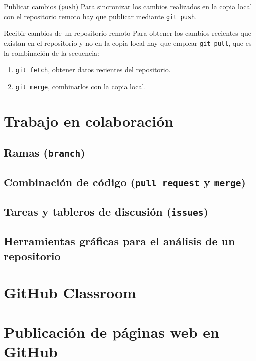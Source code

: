 \documentclass[xcolor={usenames,svgnames,dvipsnames}]{beamer}
\begin{document}
\begin{frame}[label={sec:org44cbae1},fragile]{Publicar cambios (\texttt{push})}
 Para sincronizar los cambios realizados en la copia local con el repositorio remoto hay que publicar mediante \texttt{git push}.
\end{frame}
\begin{frame}[label={sec:org7f3fc6f},fragile]{Recibir cambios de un repositorio remoto}
 Para obtener los cambios recientes que existan en el repositorio y no en la copia local hay que emplear \texttt{git pull}, que es la combinación de la secuencia:
\begin{enumerate}
\item \texttt{git fetch}, obtener datos recientes del repositorio.
\item \texttt{git merge}, combinarlos con la copia local.
\end{enumerate}
\end{frame}

\section{Trabajo en colaboración}
\label{sec:org71f1610}
\subsection{Ramas (\texttt{branch})}
\label{sec:org9aa3c8b}
\subsection{Combinación de código (\texttt{pull request} y \texttt{merge})}
\label{sec:orgef97ace}
\subsection{Tareas y tableros de discusión (\texttt{issues})}
\label{sec:orgc62fa49}
\subsection{Herramientas gráficas para el análisis de un repositorio}
\label{sec:org8c7a92f}
\section{GitHub Classroom}
\label{sec:orgad19371}
\section{Publicación de páginas web en GitHub}
\label{sec:orgaadbc2e}
\end{document}
